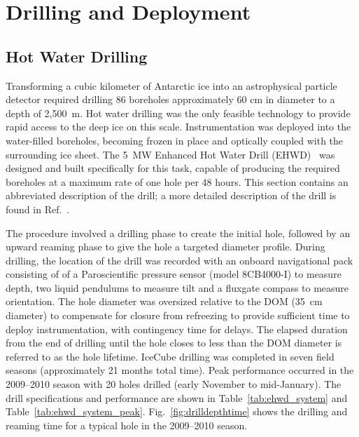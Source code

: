 
\section{\label{sec:drill-deploy}Drilling and Deployment}

\subsection{\label{sec:hot_water_drilling}Hot Water Drilling}

Transforming a cubic kilometer of Antarctic ice into an astrophysical
particle detector required drilling 86 boreholes
approximately 60 cm in diameter to a depth of 2,500~m. Hot water drilling
was the only
feasible technology to provide rapid access to the deep ice on this scale.
Instrumentation was deployed into the water-filled boreholes, becoming
frozen in place and optically
coupled with the surrounding ice sheet. The 5~MW Enhanced Hot Water Drill
(EHWD)~\cite{ehwd} was designed and built specifically for this task,
capable of producing the required boreholes at a maximum rate of one hole per 48
hours. This section contains an abbreviated description of the drill; a more detailed description of the drill
is found in Ref.~\cite{ehwd}.

The procedure involved a drilling phase to create the initial hole,
followed by an upward reaming phase to give the 
hole a targeted diameter profile.  During drilling, the location of
the drill was recorded with an onboard navigational pack consisting of
of a Paroscientific pressure sensor
(model 8CB4000-I) to measure depth, two
liquid pendulums to measure tilt and a fluxgate compass to measure orientation. The hole diameter was oversized relative to
the DOM (35~cm diameter) to compensate for closure from refreezing to provide sufficient
time to deploy instrumentation, with contingency time for delays.  The
elapsed duration from the end of drilling until the hole closes to
less than the DOM diameter is referred to as the hole lifetime. IceCube drilling was
completed in seven field seasons (approximately 21 months total time).
Peak performance occurred in the 2009--2010 season with 20 holes drilled
(early November to mid-January).  The drill specifications and performance
are shown in Table~\ref{tab:ehwd_system} and
Table~\ref{tab:ehwd_system_peak}. Fig.~\ref{fig:drilldepthtime} shows the
drilling and reaming time for a typical hole in the 2009--2010 season.

